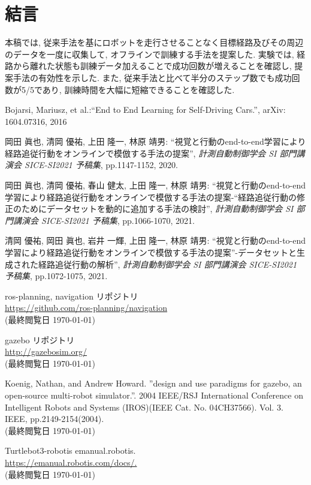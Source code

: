 \documentclass{ujarticle}
\begin{document}
\section{結言}%
本稿では, 従来手法を基にロボットを走行させることなく目標経路及びその周辺のデータを一度に収集して, オフラインで訓練する手法を提案した. 実験では, 経路から離れた状態も訓練データ加えることで成功回数が増えることを確認し, 提案手法の有効性を示した. また, 従来手法と比べて半分のステップ数でも成功回数が5/5であり, 訓練時間を大幅に短縮できることを確認した. 


\footnotesize
\begin{thebibliography}{99}

Bojarsi, Mariusz, et al.:``End to End Learning for Self-Driving Cars.'', arXiv: 1604.07316, 2016

岡田 眞也, 清岡 優祐, 上田 隆一, 林原 靖男: ``視覚と行動のend-to-end学習により経路追従行動をオンラインで模倣する手法の提案'', \textit{計測自動制御学会 SI 部門講演会 SICE-SI2021 予稿集}, pp.1147-1152, 2020.

岡田 眞也, 清岡 優祐, 春山 健太, 上田 隆一, 林原 靖男: ``視覚と行動のend-to-end学習により経路追従行動をオンラインで模倣する手法の提案-“経路追従行動の修正のためにデータセットを動的に追加する手法の検討'', \textit{計測自動制御学会 SI 部門講演会 SICE-SI2021 予稿集}, pp.1066-1070, 2021.

清岡 優祐, 岡田 眞也, 岩井 一輝, 上田 隆一, 林原 靖男: ``視覚と行動のend-to-end学習により経路追従行動をオンラインで模倣する手法の提案''-データセットと生成された経路追従行動の解析'', \textit{計測自動制御学会 SI 部門講演会 SICE-SI2021 予稿集}, pp.1072-1075, 2021.

ros-planning, navigation リポジトリ\\
\url{https://github.com/ros-planning/navigation}\\
(最終閲覧日 \today)

gazebo リポジトリ\\
\url{http://gazebosim.org/}\\
(最終閲覧日 \today)

Koenig, Nathan, and Andrew Howard. ”design and use paradigms for gazebo, an open-source multi-robot simulator.”. 2004 IEEE/RSJ International Conference on Intelligent Robots and Systems (IROS)(IEEE Cat. No. 04CH37566). Vol. 3. IEEE, pp.2149-2154(2004).\\
(最終閲覧日 \today)

Turtlebot3-robotis emanual.robotis.\\
\url{https://emanual.robotis.com/docs/.}\\
(最終閲覧日 \today)

\end{thebibliography}

\normalsize
\end{document}
